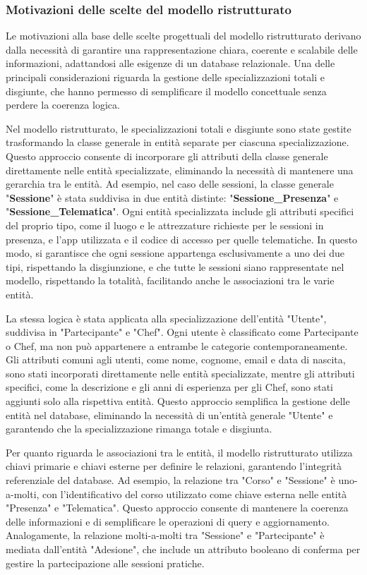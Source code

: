 \subsubsection{Motivazioni delle scelte del modello ristrutturato}
Le motivazioni alla base delle scelte progettuali del modello ristrutturato derivano dalla necessità di garantire una rappresentazione chiara, coerente e scalabile delle informazioni, adattandosi alle esigenze di un database relazionale. Una delle principali considerazioni riguarda la gestione delle specializzazioni totali e disgiunte, che hanno permesso di semplificare il modello concettuale senza perdere la coerenza logica.

Nel modello ristrutturato, le specializzazioni totali e disgiunte sono state gestite trasformando la classe generale in entità separate per ciascuna specializzazione. Questo approccio consente di incorporare gli attributi della classe generale direttamente nelle entità specializzate, eliminando la necessità di mantenere una gerarchia tra le entità. Ad esempio, nel caso delle sessioni, la classe generale "\textbf{Sessione}" è stata suddivisa in due entità distinte: "\textbf{Sessione\_Presenza}" e "\textbf{Sessione\_Telematica}". Ogni entità specializzata include gli attributi specifici del proprio tipo, come il luogo e le attrezzature richieste per le sessioni in presenza, e l'app utilizzata e il codice di accesso per quelle telematiche. In questo modo, si garantisce che ogni sessione appartenga esclusivamente a uno dei due tipi, rispettando la disgiunzione, e che tutte le sessioni siano rappresentate nel modello, rispettando la totalità, facilitando anche le associazioni tra le varie entità.

La stessa logica è stata applicata alla specializzazione dell'entità "Utente", suddivisa in "Partecipante" e "Chef". Ogni utente è classificato come Partecipante o Chef, ma non può appartenere a entrambe le categorie contemporaneamente. Gli attributi comuni agli utenti, come nome, cognome, email e data di nascita, sono stati incorporati direttamente nelle entità specializzate, mentre gli attributi specifici, come la descrizione e gli anni di esperienza per gli Chef, sono stati aggiunti solo alla rispettiva entità. Questo approccio semplifica la gestione delle entità nel database, eliminando la necessità di un'entità generale "Utente" e garantendo che la specializzazione rimanga totale e disgiunta.

Per quanto riguarda le associazioni tra le entità, il modello ristrutturato utilizza chiavi primarie e chiavi esterne per definire le relazioni, garantendo l'integrità referenziale del database. Ad esempio, la relazione tra "Corso" e "Sessione" è uno-a-molti, con l'identificativo del corso utilizzato come chiave esterna nelle entità "Presenza" e "Telematica". Questo approccio consente di mantenere la coerenza delle informazioni e di semplificare le operazioni di query e aggiornamento. Analogamente, la relazione molti-a-molti tra "Sessione" e "Partecipante" è mediata dall'entità "Adesione", che include un attributo booleano di conferma per gestire la partecipazione alle sessioni pratiche.


